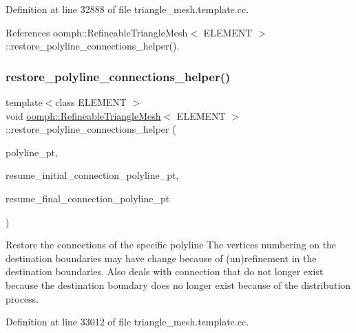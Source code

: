 Definition at line 32888 of file triangle\+\_\+mesh.\+template.\+cc.



References oomph\+::\+Refineable\+Triangle\+Mesh$<$ E\+L\+E\+M\+E\+N\+T $>$\+::restore\+\_\+polyline\+\_\+connections\+\_\+helper().

\mbox{\label{classoomph_1_1RefineableTriangleMesh_ad88a1e3f1d31392623f348d8a4718a56}} 
\subsubsection{\texorpdfstring{restore\+\_\+polyline\+\_\+connections\+\_\+helper()}{restore\_polyline\_connections\_helper()}}
{\footnotesize\ttfamily template$<$class E\+L\+E\+M\+E\+NT $>$ \\
void \hyperlink{classoomph_1_1RefineableTriangleMesh}{oomph\+::\+Refineable\+Triangle\+Mesh}$<$ E\+L\+E\+M\+E\+NT $>$\+::restore\+\_\+polyline\+\_\+connections\+\_\+helper (\begin{DoxyParamCaption}\item[{Triangle\+Mesh\+Poly\+Line $\ast$}]{polyline\+\_\+pt,  }\item[{Vector$<$ Triangle\+Mesh\+Poly\+Line $\ast$$>$ \&}]{resume\+\_\+initial\+\_\+connection\+\_\+polyline\+\_\+pt,  }\item[{Vector$<$ Triangle\+Mesh\+Poly\+Line $\ast$$>$ \&}]{resume\+\_\+final\+\_\+connection\+\_\+polyline\+\_\+pt }\end{DoxyParamCaption})\hspace{0.3cm}{\ttfamily [protected]}}



Restore the connections of the specific polyline The vertices numbering on the destination boundaries may have change because of (un)refinement in the destination boundaries. Also deals with connection that do not longer exist because the destination boundary does no longer exist because of the distribution process. 



Definition at line 33012 of file triangle\+\_\+mesh.\+template.\+cc.



